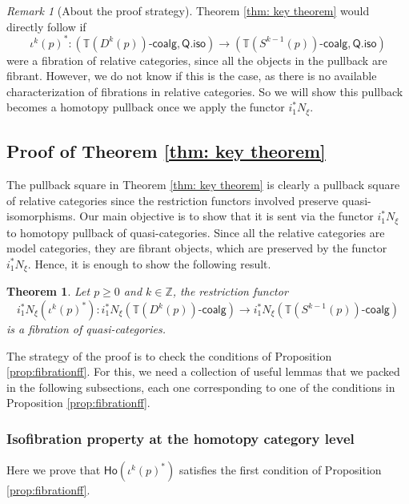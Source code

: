 \documentclass{proc-l}
\newcommand{\ho}[1]{\mathsf{Ho}(#1)}
\newcommand{\onecoalg}[1]{#1\text{-}\mathsf{coalg}}
\theoremstyle{plain}
\newtheorem{theorem}{Theorem}[section]
\theoremstyle{definition}
\theoremstyle{remark}
\newtheorem{remark}[{theorem}]{Remark}
\begin{document}
\begin{remark}[{About the proof strategy}]%
\label{Remark:4.12}
Theorem \ref{thm: key theorem} would directly follow if
\[
\iota^k(p)^*: (\onecoalg{\mathbb{T}(D^k(p))},\mathsf{Q.iso}) \longrightarrow (\onecoalg{\mathbb{T}(S^{k-1}(p))},\mathsf{Q.iso})
\]
were a fibration of relative categories, since all the objects in the pullback are fibrant. However, we do not know if this is the case, as there is no available characterization of fibrations in relative categories. So we will show this pullback becomes a homotopy pullback once we apply the functor $i_1^*N_{\xi}$.
\end{remark}

\subsection{Proof of Theorem \ref{thm: key theorem}}%
\label{Section:4.4}\label{S: the gluing proof}
The pullback square in Theorem \ref{thm: key theorem} is clearly a pullback square of relative categories since the restriction functors involved preserve quasi-isomorphisms. Our main objective is to show that it is sent via the functor $i_1^*N_{\xi}$ to homotopy pullback of quasi-categories. Since all the relative categories are model categories, they are fibrant objects, which are preserved by the functor $i_1^*N_{\xi}$. Hence, it is enough to show the following result.

\begin{theorem}%
\label{Theorem:4.13}\label{thm: fibrationquasicat}
Let $p \geq 0$ and $k \in \mathbb{Z}$, the restriction functor
\[
i_1^*N_{\xi}(\iota^k(p)^*):i_1^*N_{\xi}\left(\onecoalg{\mathbb{T}(D^k(p))} \right)\longrightarrow i_1^*N_{\xi} \left(\onecoalg{\mathbb{T}(S^{k-1}(p))}\right)
\]
is a fibration of quasi-categories.
\end{theorem}

The strategy of the proof is to check the conditions of Proposition \ref{prop:fibrationff}. For this, we need a collection of useful lemmas that we packed in the following subsections, each one corresponding to one of the conditions in Proposition \ref{prop:fibrationff}.

\subsubsection{Isofibration property at the homotopy category level}%
\label{Section:4.4.1} Here we prove that $\ho{\iota^k(p)^*}$ satisfies the first condition of Proposition \ref{prop:fibrationff}.
\end{document}
